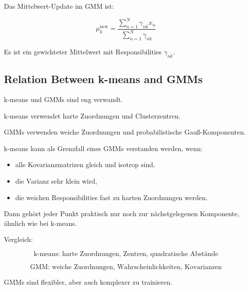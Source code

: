 \documentclass[11pt,a4paper]{scrartcl}
\begin{document}
\begin{answerbox}
    Das Mittelwert-Update im GMM ist:

    \[
        \boxed{
            \mu_k^{\mathrm{new}}
            =
            \frac{
                \sum_{n=1}^{N}
                \gamma_{nk}x_n
            }{
                \sum_{n=1}^{N}
                \gamma_{nk}
            }
        }
    \]

    Es ist ein gewichteter Mittelwert mit Responsibilities \(\gamma_{nk}\).
\end{answerbox}

\subsection{Relation Between k-means and GMMs}

\begin{notebox}
    k-means und GMMs sind eng verwandt.

    k-means verwendet harte Zuordnungen und Clusterzentren.

    GMMs verwenden weiche Zuordnungen und probabilistische Gauß-Komponenten.
\end{notebox}

\begin{solutionbox}
    k-means kann als Grenzfall eines GMMs verstanden werden, wenn:

    \begin{itemize}
        \item alle Kovarianzmatrizen gleich und isotrop sind,
        \item die Varianz sehr klein wird,
        \item die weichen Responsibilities fast zu harten Zuordnungen werden.
    \end{itemize}

    Dann gehört jeder Punkt praktisch nur noch zur nächstgelegenen Komponente,
    ähnlich wie bei k-means.
\end{solutionbox}

\begin{answerbox}
    Vergleich:

    \[
        \boxed{
            \text{k-means: harte Zuordnungen, Zentren, quadratische Abstände}
        }
    \]

    \[
        \boxed{
            \text{GMM: weiche Zuordnungen, Wahrscheinlichkeiten, Kovarianzen}
        }
    \]

    GMMs sind flexibler, aber auch komplexer zu trainieren.
\end{answerbox}
\end{document}

